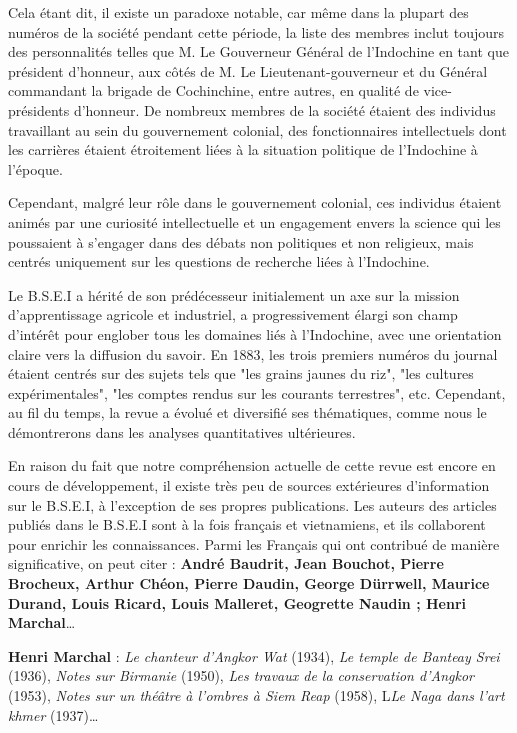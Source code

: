 Cela étant dit, il existe un paradoxe notable, car même dans la plupart des numéros de la société pendant cette période, la liste des membres inclut toujours des personnalités telles que M. Le Gouverneur Général de l'Indochine en tant que président d'honneur, aux côtés de M. Le Lieutenant-gouverneur et du Général commandant la brigade de Cochinchine, entre autres, en qualité de vice-présidents d'honneur. De nombreux membres de la société étaient des individus travaillant au sein du gouvernement colonial, des fonctionnaires intellectuels dont les carrières étaient étroitement liées à la situation politique de l'Indochine à l'époque.

Cependant, malgré leur rôle dans le gouvernement colonial, ces individus étaient animés par une curiosité intellectuelle et un engagement envers la science qui les poussaient à s'engager dans des débats non politiques et non religieux, mais centrés uniquement sur les questions de recherche liées à l'Indochine.

Le B.S.E.I a hérité de son prédécesseur initialement un axe sur la mission d'apprentissage agricole et industriel, a progressivement élargi son champ d'intérêt pour englober tous les domaines liés à l'Indochine, avec une orientation claire vers la diffusion du savoir. En 1883, les trois premiers numéros du journal étaient centrés sur des sujets tels que "les grains jaunes du riz", "les cultures expérimentales", "les comptes rendus sur les courants terrestres", etc. Cependant, au fil du temps, la revue a évolué et diversifié ses thématiques, comme nous le démontrerons dans les analyses quantitatives ultérieures.

En raison du fait que notre compréhension actuelle de cette revue est encore en cours de développement, il existe très peu de sources extérieures d'information sur le B.S.E.I, à l'exception de ses propres publications. Les auteurs des articles publiés dans le B.S.E.I sont à la fois français et vietnamiens, et ils collaborent pour enrichir les connaissances. Parmi les Français qui ont contribué de manière significative, on peut citer : \textbf{André Baudrit, Jean Bouchot, Pierre Brocheux, Arthur Chéon, Pierre Daudin, George Dürrwell, Maurice Durand, Louis Ricard, Louis Malleret, Geogrette Naudin ; Henri Marchal}… 

\textbf{Henri Marchal }: \textit{Le chanteur d'Angkor Wat} (1934), \textit{Le temple de Banteay Srei} (1936), \textit{Notes sur Birmanie} (1950), \textit{Les travaux de la conservation d'Angkor} (1953), \textit{Notes sur un théâtre à l'ombres à Siem Reap} (1958), L\textit{Le Naga dans l'art khmer} (1937)… 

